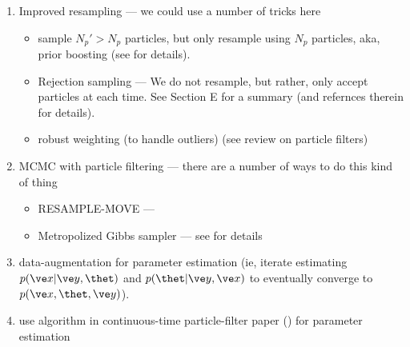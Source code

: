 \begin{enumerate}
\item Improved resampling --- we could use a number of tricks here
\begin{itemize}
\item  sample $N_p' > N_p$ particles, but only resample using $N_p$ particles, aka, prior boosting (see \cite{Green95,CarpenterFearnhead99} for details).
\item  Rejection sampling --- We do not resample, but rather, only accept particles at each time. See \cite{Chen03} Section E for a summary  (and refernces therein for details). 
%
\item  robust weighting (to handle outliers) (see review on particle filters)
\end{itemize}  

\item MCMC with particle filtering --- there are a number of ways to do this kind of thing
\begin{itemize}
\item RESAMPLE-MOVE --- 
\item Metropolized Gibbs sampler --- see \cite{Liu96} for details
\end{itemize} 

\item data-augmentation for parameter estimation (ie, iterate estimating $p(\x | \y, \thet)$ and $p(\thet | \y, \x)$ to eventually converge to $p(\x, \thet, \y)$).
\item use algorithm in continuous-time particle-filter paper (\cite{NgDearden05}) for parameter estimation
\end{enumerate}

